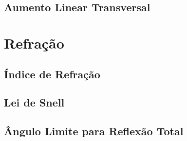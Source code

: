 \subsection{Aumento Linear Transversal}






\section{Refração}


\subsection{Índice de Refração}

\subsection{Lei de Snell}

\subsection{Ângulo Limite para Reflexão Total}